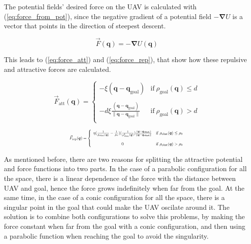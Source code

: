\documentclass[journal]{IEEEtran}
\newcommand*{\subb}[1]{_{\mathrm{#1}}}
\begin{document}
	The potential fields' desired force on the UAV is calculated with (\ref{eq:force_from_pot}), since the negative gradient of a potential field $-\bm{\nabla} U$ is a vector that points in the direction of steepest descent. 
	
	\begin{equation} \label{eq:force_from_pot}
		\vec{F}(\bm{q}) = - \bm{\nabla} U(\bm{q})
	\end{equation}
	
	This leads to (\ref{eq:force_att}) and (\ref{eq:force_rep}), that show how these repulsive and attractive forces are calculated.
	
	\begin{equation} \label{eq:force_att}
		\vec{F}\subb{att}(\bm{q}) =  \left\lbrace  {\begin{array}{cc}
			- \xi (\bm{q}-\bm{q\subb{goal}})& \textrm{if} \ \rho\subb{goal}(\bm{q})\leq d \\
			\\
			-d \xi \frac{(\bm{q}-\bm{q\subb{goal}})}{\parallel\bm{q}-\bm{q\subb{goal}}\parallel}&\textrm{if} \ \rho\subb{goal}(\bm{q})> d \\
			\end{array} } \right.
	\end{equation}

	\begin{equation} \label{eq:force_rep}	
		\resizebox{0.5\textwidth}{!}{ $
		\vec{F}\subb{rep}(\bm{q}) =  \left\lbrace  {\begin{array}{cc}
		\eta (\frac{1}{\rho\subb{obst}(\bm{q})}-\frac{1}{\rho\subb{0}})(\frac{1}{\rho\subb{obst}^2(\bm{q})})\frac{(\bm{q}-\bm{q\subb{obst}})}{\parallel\bm{q}-\bm{q\subb{obst}}\parallel} & \textrm{if} \ \rho\subb{obst}(\bm{q})\leq \rho\subb{0} \\
		\\
		0 &\textrm{if} \ \rho\subb{obst}(\bm{q})> \rho\subb{0} \\
		\end{array} } \right. $}
	\end{equation}
	
	As mentioned before, there are two reasons for splitting the attractive potential and force functions into two parts. In the case of a parabolic configuration for all the space, there is a linear dependence of the force with the distance between UAV and goal, hence the force grows indefinitely when far from the goal. At the same time, in the case of a conic configuration for all the space, there is a singular point in the goal that could make the UAV oscilate around it. The solution is to combine both configurations to solve this problems, by making the force constant when far from the goal with a conic configuration, and then using a parabolic function when reaching the goal to avoid the singularity.\\
	
\end{document}
